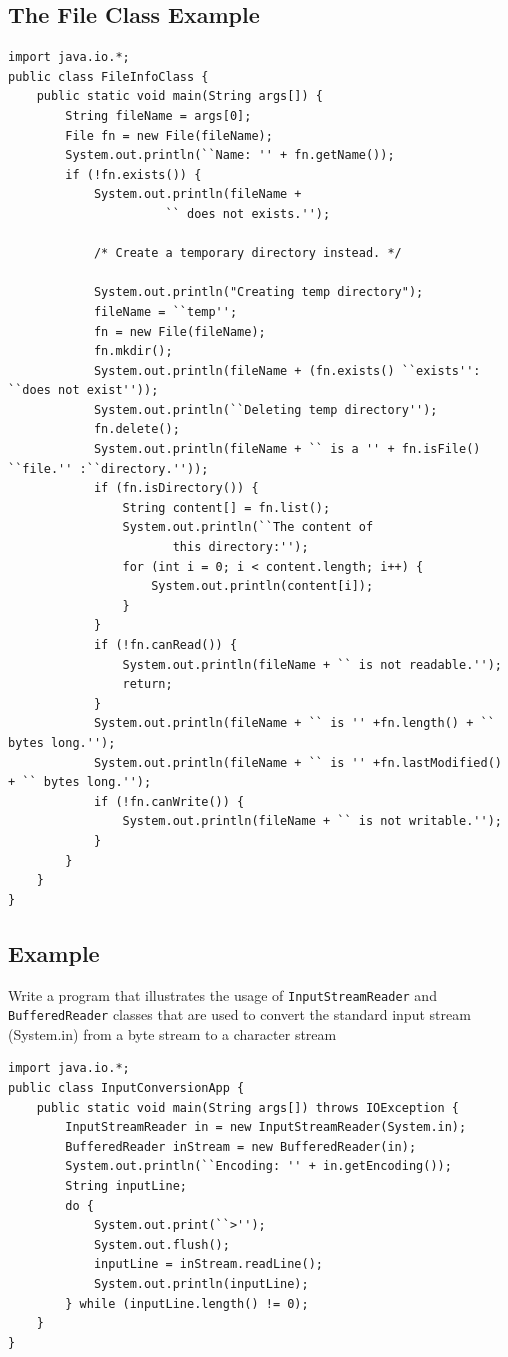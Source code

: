 \documentclass[11pt,a4paper]{article}
\begin{document}
\subsection*{The File Class Example}
\begin{lstlisting}
import java.io.*; 
public class FileInfoClass { 
    public static void main(String args[]) { 
        String fileName = args[0]; 
        File fn = new File(fileName); 
        System.out.println(``Name: '' + fn.getName()); 
        if (!fn.exists()) { 
            System.out.println(fileName + 
                      `` does not exists.''); 
            
            /* Create a temporary directory instead. */ 
            
            System.out.println("Creating temp directory"); 
            fileName = ``temp'';
            fn = new File(fileName); 
            fn.mkdir(); 
            System.out.println(fileName + (fn.exists() ``exists'': ``does not exist'')); 
            System.out.println(``Deleting temp directory''); 
            fn.delete(); 
            System.out.println(fileName + `` is a '' + fn.isFile() ``file.'' :``directory.'')); 
            if (fn.isDirectory()) { 
                String content[] = fn.list(); 
                System.out.println(``The content of 
                       this directory:'');
                for (int i = 0; i < content.length; i++) {
                    System.out.println(content[i]); 
                } 
            } 
            if (!fn.canRead()) { 
                System.out.println(fileName + `` is not readable.''); 
                return;
            } 
            System.out.println(fileName + `` is '' +fn.length() + `` bytes long.''); 
            System.out.println(fileName + `` is '' +fn.lastModified() + `` bytes long.''); 
            if (!fn.canWrite()) { 
                System.out.println(fileName + `` is not writable.''); 
            } 
        } 
    }
}
\end{lstlisting}

\subsection*{Example}
Write a program that illustrates the usage of \texttt{InputStreamReader} and \texttt{BufferedReader} classes that are used to convert the standard input stream (System.in) from a byte stream to a character stream

\begin{lstlisting}
import java.io.*; 
public class InputConversionApp { 
    public static void main(String args[]) throws IOException { 
        InputStreamReader in = new InputStreamReader(System.in); 
        BufferedReader inStream = new BufferedReader(in); 
        System.out.println(``Encoding: '' + in.getEncoding()); 
        String inputLine; 
        do { 
            System.out.print(``>''); 
            System.out.flush(); 
            inputLine = inStream.readLine(); 
            System.out.println(inputLine); 
        } while (inputLine.length() != 0); 
    } 
}
\end{lstlisting} 
\end{document}
